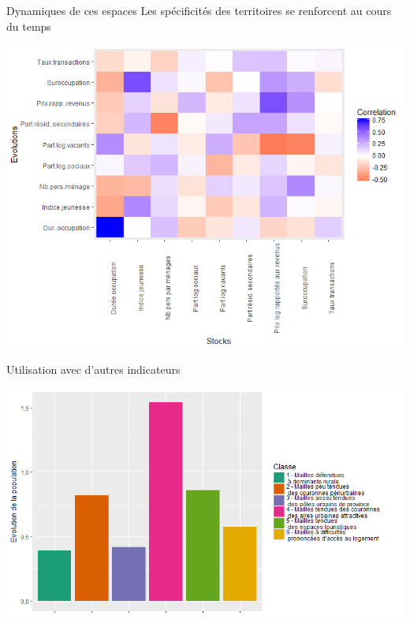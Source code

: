 \documentclass[11pt]{beamer}
\begin{document}
\begin{frame}{Dynamiques de ces espaces}
Les spécificités des territoires se renforcent au cours du temps 
\begin{center}
\includegraphics[scale=.5]{img/Dynam}
\end{center}
\end{frame}

\begin{frame}{Utilisation avec d'autres indicateurs}
\begin{center}
\includegraphics[scale=.55]{img/Evol_pop}
\end{center}
\end{frame}
\end{document}
